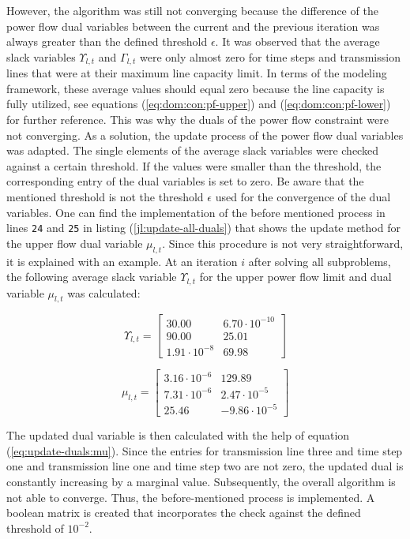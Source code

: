 However, the algorithm was still not converging because the difference of the power flow dual variables between the current and the previous iteration was always greater than the defined threshold $\epsilon$. It was observed that the average slack variables $\Upsilon_{l,t}$ and $\Gamma_{l,t}$ were only almost zero for time steps and transmission lines that were at their maximum line capacity limit. In terms of the modeling framework, these average values should equal zero because the line capacity is fully utilized, see equations (\ref{eq:dom:con:pf-upper}) and (\ref{eq:dom:con:pf-lower}) for further reference. This was why the duals of the power flow constraint were not converging. As a solution, the update process of the power flow dual variables was adapted. The single elements of the average slack variables were checked against a certain threshold. If the values were smaller than the threshold, the corresponding entry of the dual variables is set to zero. Be aware that the mentioned threshold is not the threshold $\epsilon$ used for the convergence of the dual variables. One can find the implementation of the before mentioned process in lines \texttt{24} and \texttt{25} in listing (\ref{jl:update-all-duals}) that shows the update method for the upper flow dual variable $\mu_{l,t}$. Since this procedure is not very straightforward, it is explained with an example. At an iteration $i$ after solving all subproblems, the following average slack variable $\Upsilon_{l,t}$ for the upper power flow limit and dual variable $\mu_{l,t}$ was calculated:

\begin{equation}
	\Upsilon_{l,t} = \begin{bmatrix}
			30.00 & 6.70 \cdot 10^{-10} \\
			90.00 & 25.01 \\
			1.91 \cdot 10^{-8} & 69.98
		\end{bmatrix}
\end{equation}

\begin{equation}
	\mu_{l,t} = \begin{bmatrix}
			3.16 \cdot 10^{-6} & 129.89 \\
			7.31 \cdot 10^{-6} & 2.47 \cdot 10^{-5} \\
			25.46 & -9.86 \cdot 10^{-5}
		\end{bmatrix}
\end{equation}

The updated dual variable is then calculated with the help of equation (\ref{eq:update-duals:mu}). Since the entries for transmission line three and time step one and transmission line one and time step two are not zero, the updated dual is constantly increasing by a marginal value. Subsequently, the overall algorithm is not able to converge. Thus, the before-mentioned process is implemented. A boolean matrix is created that incorporates the check against the defined threshold of $10^{-2}$.

